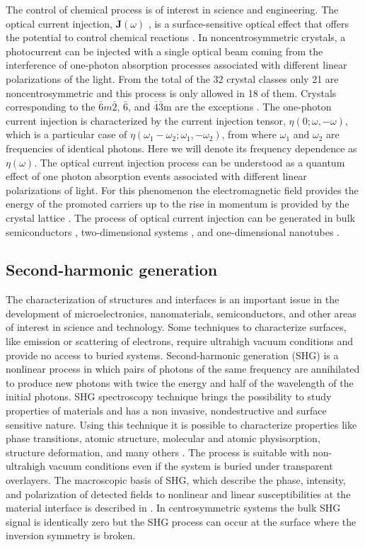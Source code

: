 \documentclass[pss]{wiley2sp} %
\begin{document}
The control of chemical process is of interest in science and engineering. The optical current injection, $\mathbf{\dot{J}}(\omega)$ , is a surface-sensitive optical effect that offers the potential to control chemical reactions \cite{bhatPRB05,hachePRL97}. In noncentrosymmetric crystals, a photocurrent can be injected with a single optical beam coming  from the interference of one-photon absorption processes associated with different linear polarizations of the light. From the total of the 32 crystal classes only 21 are noncentrosymmetric and this process is only allowed in 18 of them. Crystals corresponding to the $\bar{6}m\bar{2}$, $\bar{6}$, and $\bar{4}$$\bar{3}$m are the exceptions \cite{sipePRB00}. The one-photon current injection is characterized by the current injection tensor, $\eta(0; \omega, − \omega)$, which is a particular case of $\eta(\omega_{1}-\omega_{2}; \omega_{1},-\omega_{2})$, from where $\omega_{1}$ and $\omega_{2}$ are frequencies of identical photons. Here we will denote its frequency dependence as $\eta(\omega)$. The optical current injection process can be understood as a quantum effect of one photon absorption events associated with different linear polarizations of light. For this phenomenon the electromagnetic field provides the energy of the promoted carriers up to the rise in momentum is provided by the crystal lattice \cite{arzatePRB14}. The process of optical current injection can be generated in bulk semiconductors \cite{hachePRL97,sipePRB00}, two-dimensional systems \cite{melePRB00,cabellosPRB11}, and one-dimensional nanotubes \cite{melePRB00}. 

\subsection{Second-harmonic generation}

The characterization of structures and interfaces is an important issue in the development of microelectronics, nanomaterials, semiconductors, and other areas of interest in science and technology. Some techniques to characterize surfaces, like emission or scattering of electrons, require ultrahigh vacuum conditions and provide no access to buried systems. Second-harmonic generation (SHG) is a nonlinear process in which pairs of photons of the same frequency are annihilated to produce new photons with twice the energy and half of the wavelength of the initial photons. SHG spectroscopy technique brings the possibility to study properties of materials and has a non invasive, nondestructive and surface sensitive nature. Using this technique it is possible to characterize properties like phase transitions, atomic structure, molecular and atomic physisorption, structure deformation, and many others \cite{dadapPRB97,godefroyAPL96,salazarPRB14,mendozaPRL98}. The process is suitable with non-ultrahigh vacuum conditions even if the system is buried under transparent overlayers. The macroscopic basis of SHG, which describe the phase, intensity, and polarization of detected fields to nonlinear and linear susceptibilities at the material interface is described in \cite{downerSIA01}. In centrosymmetric systems the bulk SHG signal is identically zero but the SHG process can occur at the surface where the inversion symmetry is broken.  
\end{document}
